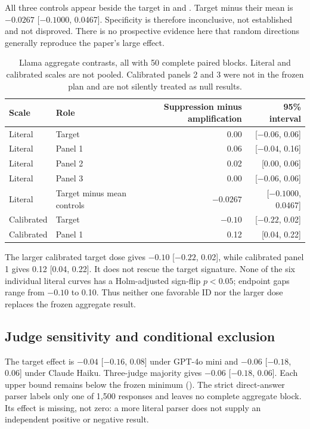 \documentclass[11pt]{article}
\begin{document}
All three controls appear beside the target in  and
. Target minus their mean is $-0.0267$ [$-0.1000$, 0.0467].
Specificity is therefore inconclusive, not established and not disproved.
There is no prospective evidence here that random directions generally
reproduce the paper's large effect.

\begin{table}[t]
\centering\small
\caption{Llama aggregate contrasts, all with 50 complete paired blocks.
Literal and calibrated scales are not pooled. Calibrated panels 2 and 3 were
not in the frozen plan and are not silently treated as null results.}
\label{tab:scales}
\begin{tabular}{@{}llrr@{}}
\toprule
Scale & Role & Suppression minus amplification & 95\% interval\\
\midrule
Literal & Target & 0.00 & [$-0.06$, 0.06]\\
Literal & Panel 1 & 0.06 & [$-0.04$, 0.16]\\
Literal & Panel 2 & 0.02 & [0.00, 0.06]\\
Literal & Panel 3 & 0.00 & [$-0.06$, 0.06]\\
Literal & Target minus mean controls & $-0.0267$ & [$-0.1000$, 0.0467]\\
\midrule
Calibrated & Target & $-0.10$ & [$-0.22$, 0.02]\\
Calibrated & Panel 1 & 0.12 & [0.04, 0.22]\\
\bottomrule
\end{tabular}
\end{table}

The larger calibrated target dose gives $-0.10$ [$-0.22$, 0.02], while
calibrated panel 1 gives 0.12 [0.04, 0.22]. It does not rescue the target
signature. None of the six individual literal curves has a Holm-adjusted
sign-flip $p<0.05$; endpoint gaps range from $-0.10$ to 0.10. Thus neither
one favorable ID nor the larger dose replaces the frozen aggregate result.

\subsection{Judge sensitivity and conditional exclusion}

The target effect is $-0.04$ [$-0.16$, 0.08] under GPT-4o mini and $-0.06$
[$-0.18$, 0.06] under Claude Haiku. Three-judge majority gives $-0.06$
[$-0.18$, 0.06]. Each upper bound remains below the frozen minimum
(). The strict direct-answer parser labels only one of
1,500 responses and leaves no complete aggregate block. Its effect is
missing, not zero: a more literal parser does not supply an independent
positive or negative result.
\end{document}

